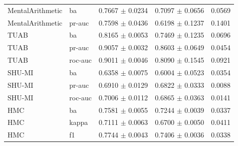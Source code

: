 \begin{table}[tbp]
\begin{tabular}{@{}l l c c c@{}}
MentalArithmetic & ba & 0.7667 $\pm$ 0.0234 & 0.7097 $\pm$ 0.0656 & 0.0569 \\
MentalArithmetic & pr-auc & 0.7598 $\pm$ 0.0436 & 0.6198 $\pm$ 0.1237 & 0.1401 \\
TUAB & ba & 0.8165 $\pm$ 0.0053 & 0.7469 $\pm$ 0.1235 & 0.0696 \\
TUAB & pr-auc & 0.9057 $\pm$ 0.0032 & 0.8603 $\pm$ 0.0649 & 0.0454 \\
TUAB & roc-auc & 0.9011 $\pm$ 0.0046 & 0.8090 $\pm$ 0.1545 & 0.0921 \\
SHU-MI & ba & 0.6358 $\pm$ 0.0075 & 0.6004 $\pm$ 0.0523 & 0.0354 \\
SHU-MI & pr-auc & 0.6910 $\pm$ 0.0129 & 0.6822 $\pm$ 0.0333 & 0.0088 \\
SHU-MI & roc-auc & 0.7006 $\pm$ 0.0112 & 0.6865 $\pm$ 0.0363 & 0.0141 \\
HMC & ba & 0.7581 $\pm$ 0.0055 & 0.7244 $\pm$ 0.0039 & 0.0337 \\
HMC & kappa & 0.7111 $\pm$ 0.0063 & 0.6700 $\pm$ 0.0050 & 0.0411 \\
HMC & f1 & 0.7744 $\pm$ 0.0043 & 0.7406 $\pm$ 0.0036 & 0.0338 \\
\bottomrule\end{tabular}\end{table}

